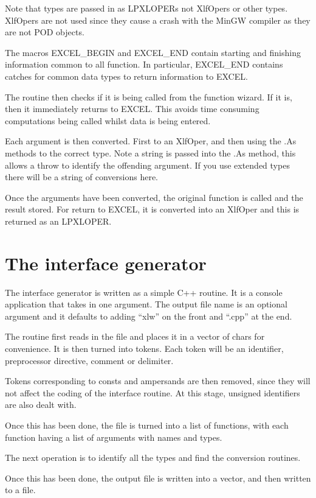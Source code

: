 \documentclass[12pt,reqno]{amsart}
\numberwithin{equation}{section}
\numberwithin{figure}{section}
\begin{document}
Note that types are passed in as LPXLOPERs not XlfOpers or other
types. XlfOpers are not used since they cause a crash with the MinGW
compiler as they are not POD objects. 

The macros EXCEL\_BEGIN and EXCEL\_END contain starting and finishing
information common to all function. In particular, EXCEL\_END contains
catches for common data types to return information to EXCEL. 

The routine then checks if it is being called from the function
wizard. If it is, then it immediately returns to EXCEL. This avoids
time consuming computations being called whilst data is being
entered. 

Each argument is then converted. First to an XlfOper, and then using
the .As methods to the correct type. Note a string is passed into the
.As method, this allows a throw to identify the offending argument. If
you use extended types there will be a string of conversions here. 

Once the arguments have been converted, the original function is
called and the result stored. For return to EXCEL, it is converted
into an XlfOper and this is returned as an LPXLOPER.

 
\section{The interface generator}

The interface generator is written as a simple C++ routine. It is a
console application that takes in one argument. The output file name
is an optional argument and it defaults to adding ``xlw'' on the front
and ``.cpp'' at the end.

The routine first reads in the file and places it in a vector of chars
for convenience. It is then turned into tokens. Each token will be an
identifier, preprocessor directive,  comment or delimiter. 

Tokens corresponding to consts and ampersands are then removed, since
they will not affect the coding of the interface routine. At this
stage, unsigned identifiers are also dealt with. 

Once this has been done, the file is turned into a list of functions,
with each function having a list of arguments with names and types.

The next operation is to identify all the types and find the
conversion routines. 

Once this has been done, the output file is written into a vector, and
then written to a file. 
\end{document}
